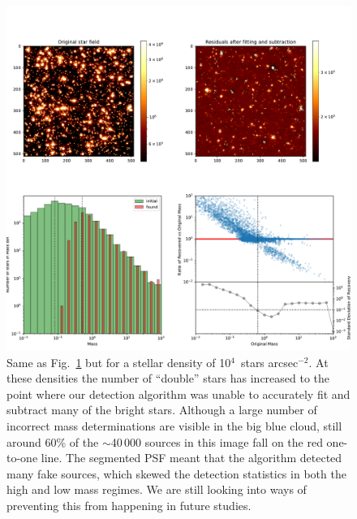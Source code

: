 \documentclass{aa}
\newcommand{\s}{$\sim$}
\newcommand{\h}[1]{$^{#1}$}
\newcommand{\spae}{stars arcsec$^{-2}$}
\begin{document}
\begin{appendix}
\begin{figure}
    \label{fig:results_lmc_1E3}
\end{figure}


\begin{figure}

    \centering
    \includegraphics[width=\textwidth]{tbl_stats_dist=50000_rho=10000.pdf}
    \caption{Same as Fig.~\ref{fig:results_lmc_1E3} but for a stellar density of 10\h4~\spae.
    At these densities the number of ``double'' stars has increased to the point where our detection algorithm was unable to accurately fit and subtract many of the bright stars.
    Although a large number of incorrect mass determinations are visible in the big blue cloud, still around 60\% of the \s40\,000 sources in this image fall on the red one-to-one line.
    The segmented PSF meant that the algorithm detected many fake sources, which skewed the detection statistics in both the high and low mass regimes.
    We are still looking into ways of preventing this from happening in future studies.}

    \label{fig:results_lmc_1E4}

\end{figure}

\end{appendix}




\end{document}
